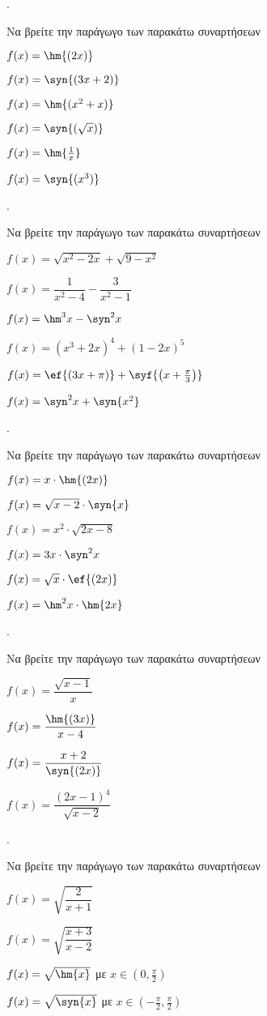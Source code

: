 \documentclass[11pt,a4paper,twocolumn]{article}
\newcounter{askhsh}
\newcommand{\askhsh}{{\large\theaskhsh.}\ \addtocounter{askhsh}{1}}
\begin{document}
\askhsh Να βρείτε την παράγωγο των παρακάτω συναρτήσεων
\begin{alist}
\item $ f(x)=\hm{(2x)} $
\item $ f(x)=\syn{(3x+2)} $
\item $ f(x)=\hm{(x^2+x)} $
\item $ f(x)=\syn{(\sqrt{x})} $
\item $ f(x)=\hm{\frac{1}{x}} $
\item $ f(x)=\syn{(x^3)} $
\end{alist}
\askhsh Να βρείτε την παράγωγο των παρακάτω συναρτήσεων
\begin{alist}
\item $ f(x)=\sqrt{x^2-2x}+\sqrt{9-x^2} $
\item $ f(x)=\dfrac{1}{x^2-4}-\dfrac{3}{x^2-1} $
\item $ f(x)=\hm^3{x}-\syn^2{x} $
\item $ f(x)=(x^3+2x)^4+(1-2x)^5 $
\item $ f(x)=\ef{\left(3x+\pi\right)}+\syf{\left(x+\frac{\pi}{3}\right)} $
\item $ f(x)=\syn^2{x}+\syn{x^2} $
\end{alist}
\askhsh Να βρείτε την παράγωγο των παρακάτω συναρτήσεων
\begin{alist}
\item $ f(x)=x\cdot\hm{(2x)} $
\item $ f(x)=\sqrt{x-2}\cdot\syn{x} $
\item $ f(x)=x^2\cdot\sqrt{2x-8} $
\item $ f(x)=3x\cdot\syn^2{x} $
\item $ f(x)=\sqrt{x}\cdot\ef{(2x)} $
\item $ f(x)=\hm^2{x}\cdot\hm{2x} $
\end{alist}
\askhsh Να βρείτε την παράγωγο των παρακάτω συναρτήσεων
\begin{multicols}{2}
\begin{alist}
\item $ f(x)=\dfrac{\sqrt{x-1}}{x} $
\item $ f(x)=\dfrac{\hm{(3x)}}{x-4} $
\item $ f(x)=\dfrac{x+2}{\syn{(2x)}} $
\item $ f(x)=\dfrac{(2x-1)^4}{\sqrt{x-2}} $
\end{alist}
\end{multicols}
\askhsh Να βρείτε την παράγωγο των παρακάτω συναρτήσεων
\begin{alist}
\item $ f(x)=\sqrt{\dfrac{2}{x+1}} $
\item $ f(x)=\sqrt{\dfrac{x+3}{x-2}} $
\item $ f(x)=\sqrt{\hm{x}} $ με $ x\in\left(0,\frac{\pi}{2}\right) $
\item $ f(x)=\sqrt{\syn{x}} $ με $ x\in\left(-\frac{\pi}{2},\frac{\pi}{2}\right) $
\end{alist}
\end{document}
